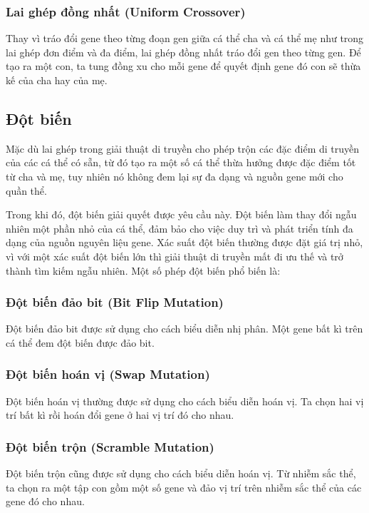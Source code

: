 \subsubsection{Lai ghép đồng nhất (Uniform Crossover)}
Thay vì tráo đổi gene theo từng đoạn gen giữa cá thể cha và cá thể mẹ như trong lai ghép đơn điểm và đa điểm, lai ghép đồng nhất tráo đổi gen theo từng gen. Để tạo ra một con, ta tung đồng xu cho mỗi gene để quyết định gene đó con sẽ thừa kế của cha hay của mẹ.

\subsection{Đột biến} \label{chap_coso:sec_ga:subsec:dotbien}
Mặc dù lai ghép trong giải thuật di truyền cho phép trộn các đặc điểm di truyền của các cá thể có sẵn, từ đó tạo ra một số cá thể thừa hưởng được đặc điểm tốt từ cha và mẹ, tuy nhiên nó không đem lại sự đa dạng và nguồn gene mới cho quần thể.

Trong khi đó, đột biến giải quyết được yêu cầu này. Đột biến làm thay đổi ngẫu nhiên một phần nhỏ của cá thể, đảm bảo cho việc duy trì và phát triển tính đa dạng của nguồn nguyên liệu gene. Xác suất đột biến thường được đặt giá trị nhỏ, vì với một xác suất đột biến lớn thì giải thuật di truyền mất đi ưu thế và trở thành tìm kiếm ngẫu nhiên.
Một số phép đột biến phổ biến là:

\subsubsection{Đột biến đảo bit (Bit Flip Mutation)}
Đột biến đảo bit được sử dụng cho cách biểu diễn nhị phân. Một gene bất kì trên cá thể đem đột biến được đảo bit.

\subsubsection{Đột biến hoán vị (Swap Mutation)}
Đột biến hoán vị thường được sử dụng cho cách biểu diễn hoán vị. Ta chọn hai vị trí bất kì rồi hoán đổi gene ở hai vị trí đó cho nhau.

\subsubsection{Đột biến trộn (Scramble Mutation)}
Đột biến trộn cũng được sử dụng cho cách biểu diễn hoán vị. Từ nhiễm sắc thể, ta chọn ra một tập con gồm một số gene và đảo vị trí trên nhiễm sắc thể của các gene đó cho nhau.

